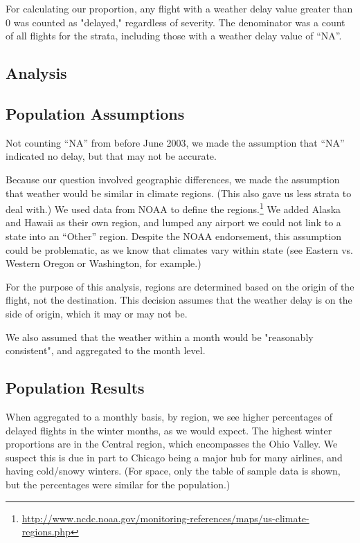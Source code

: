 \documentclass{article}
\begin{document}
For calculating our proportion, any flight with a weather delay value greater than 0 was counted as "delayed," regardless of severity. The denominator was a count of all flights for the strata, including those with a weather delay value of ``NA''. 
\begin{multicols}{2}
\section{Analysis}
\subsection{Population Assumptions}
Not counting ``NA'' from before June 2003, we made the assumption that ``NA'' indicated no delay, but that may not be accurate.

Because our question involved geographic differences, we made the assumption that weather would be similar in climate regions. (This also gave us less strata to deal with.) We used data from NOAA to define the regions.\footnote{\url{http://www.ncdc.noaa.gov/monitoring-references/maps/us-climate-regions.php}} We added Alaska and Hawaii as their own region, and lumped any airport we could not link to a state into an ``Other'' region. Despite the NOAA endorsement, this assumption could be problematic, as we know that climates vary within state (see Eastern vs. Western Oregon or Washington, for example.) 

For the purpose of this analysis, regions are determined based on the origin of the flight, not the destination. This decision assumes that the weather delay is on the side of origin, which it may or may not be. 

We also assumed that the weather within a month would be "reasonably consistent", and aggregated to the month level.



\subsection{Population Results}
When aggregated to a monthly basis, by region, we see higher percentages of delayed flights in the winter months, as we would expect. The highest winter proportions are in the Central region, which encompasses the Ohio Valley. We suspect this is due in part to Chicago being a major hub for many airlines, and having cold/snowy winters. (For space, only the table of sample data is shown, but the percentages were similar for the population.)


\end{multicols}
\end{document}
